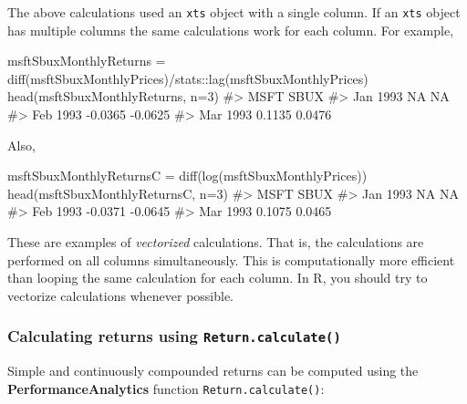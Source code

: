 \documentclass[
  letterpaper,
  DIV=11,
  numbers=noendperiod]{scrreprt}
\newenvironment{Shaded}{\begin{snugshade}}{\end{snugshade}}
\newcommand{\AttributeTok}[1]{\textcolor[rgb]{0.40,0.45,0.13}{#1}}
\newcommand{\CommentTok}[1]{\textcolor[rgb]{0.37,0.37,0.37}{#1}}
\newcommand{\DecValTok}[1]{\textcolor[rgb]{0.68,0.00,0.00}{#1}}
\newcommand{\FunctionTok}[1]{\textcolor[rgb]{0.28,0.35,0.67}{#1}}
\newcommand{\NormalTok}[1]{\textcolor[rgb]{0.00,0.23,0.31}{#1}}
\newcommand{\OtherTok}[1]{\textcolor[rgb]{0.00,0.23,0.31}{#1}}
\newcommand{\SpecialCharTok}[1]{\textcolor[rgb]{0.37,0.37,0.37}{#1}}
\theoremstyle{definition}
\theoremstyle{definition}
\theoremstyle{remark}
\begin{document}
The above calculations used an \texttt{xts} object with a single column.
If an \texttt{xts} object has multiple columns the same calculations
work for each column. For example,

\begin{Shaded}
\begin{Highlighting}[]
\NormalTok{msftSbuxMonthlyReturns }\OtherTok{=} \FunctionTok{diff}\NormalTok{(msftSbuxMonthlyPrices)}\SpecialCharTok{/}\NormalTok{stats}\SpecialCharTok{::}\FunctionTok{lag}\NormalTok{(msftSbuxMonthlyPrices)}
\FunctionTok{head}\NormalTok{(msftSbuxMonthlyReturns, }\AttributeTok{n=}\DecValTok{3}\NormalTok{)}
\CommentTok{\#\textgreater{}             MSFT    SBUX}
\CommentTok{\#\textgreater{} Jan 1993      NA      NA}
\CommentTok{\#\textgreater{} Feb 1993 {-}0.0365 {-}0.0625}
\CommentTok{\#\textgreater{} Mar 1993  0.1135  0.0476}
\end{Highlighting}
\end{Shaded}

Also,

\begin{Shaded}
\begin{Highlighting}[]
\NormalTok{msftSbuxMonthlyReturnsC }\OtherTok{=} \FunctionTok{diff}\NormalTok{(}\FunctionTok{log}\NormalTok{(msftSbuxMonthlyPrices))}
\FunctionTok{head}\NormalTok{(msftSbuxMonthlyReturnsC, }\AttributeTok{n=}\DecValTok{3}\NormalTok{)}
\CommentTok{\#\textgreater{}             MSFT    SBUX}
\CommentTok{\#\textgreater{} Jan 1993      NA      NA}
\CommentTok{\#\textgreater{} Feb 1993 {-}0.0371 {-}0.0645}
\CommentTok{\#\textgreater{} Mar 1993  0.1075  0.0465}
\end{Highlighting}
\end{Shaded}

These are examples of \emph{vectorized} calculations. That is, the
calculations are performed on all columns simultaneously. This is
computationally more efficient than looping the same calculation for
each column. In R, you should try to vectorize calculations whenever
possible.

\hypertarget{calculating-returns-using-return.calculate}{%
\subsubsection{\texorpdfstring{Calculating returns using
\texttt{Return.calculate()}}{Calculating returns using Return.calculate()}}\label{calculating-returns-using-return.calculate}}

Simple and continuously compounded returns can be computed using the
\textbf{PerformanceAnalytics} function \texttt{Return.calculate()}:
\end{document}
